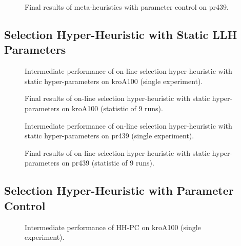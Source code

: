 \begin{figure}[!htbp]
	\centering
	
	\caption{Final results of meta-heuristics with parameter control on pr439.}
	\label{app:eval:1:pc:pr439 final}
\end{figure}

\FloatBarrier
\subsection{Selection Hyper-Heuristic with Static LLH Parameters}\label{app:eval:hh-sp}
\begin{figure}[!htbp]
	\centering
	
	\caption{Intermediate performance of on-line selection hyper-heuristic with static hyper-parameters on kroA100 (single experiment).}
	\label{app:eval:1:hh-sp:kroA100 intermediate}
\end{figure}

\begin{figure}[!htbp]
	\centering
	
	\caption{Final results of on-line selection hyper-heuristic with static hyper-parameters on kroA100 (statistic of 9 runs).}
	\label{app:eval:1:hh-sp:kroA100 final}
\end{figure}

\begin{figure}[!htbp]
	\centering
	
	\caption{Intermediate performance of on-line selection hyper-heuristic with static hyper-parameters on pr439 (single experiment).}
	\label{app:eval:1:hh-sp:pr439 intermediate}
\end{figure}

\begin{figure}[!htbp]
	\centering
	
	\caption{Final results of on-line selection hyper-heuristic with static hyper-parameters on pr439 (statistic of 9 runs).}
	\label{app:eval:1:hh-sp:pr439 final}
\end{figure}

\FloatBarrier
\subsection{Selection Hyper-Heuristic with Parameter Control}\label{app:eval:hh-pc}
\begin{figure}[!htbp]
	\centering
	
	\caption{Intermediate performance of HH-PC on kroA100 (single experiment).}
	\label{app:eval:1:hh-pc:kroA100 intermediate}
\end{figure}

